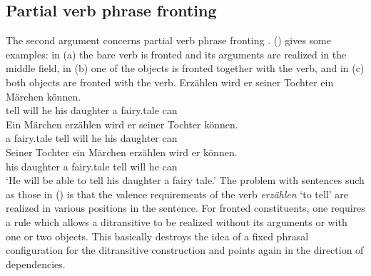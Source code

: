 \documentclass[output=paper
	        ,collection
	        ,collectionchapter
 	        ,biblatex
                ,babelshorthands
                ,newtxmath
                ,draftmode
                ,colorlinks, citecolor=brown
]{langscibook}
\begin{document}
\subsection{Partial verb phrase fronting}

The second argument concerns partial verb phrase fronting \citep[Section~5.5.2]{MuellerGT-Eng1}. 
() gives some examples: in (a) the bare verb is fronted and its arguments are realized
in the middle field, in (b) one of the objects is fronted together with the verb, and in
(c) both objects are fronted with the verb.
\eal
\ex 
\gll Erzählen wird er seiner Tochter ein Märchen können.\\
     tell will he his daughter a fairy.tale can\\
\ex 
\gll Ein Märchen erzählen wird er seiner Tochter können.\\
     a fairy.tale tell will he his daughter can\\
\ex 
\gll Seiner Tochter ein Märchen erzählen wird er können.\\
     his daughter a fairy.tale tell will he can\\
\glt `He will be able to tell his daughter a fairy tale.'
\zl
The problem with sentences such as those in () is that the valence requirements of the verb
\emph{erzählen} `to tell' are realized in various positions in the sentence. For fronted
constituents, one requires a rule which allows a ditransitive to be realized without its arguments
or with one or two objects. This basically destroys the idea of a fixed phrasal configuration for
the ditransitive construction and points again in the direction of dependencies.
\end{document}
